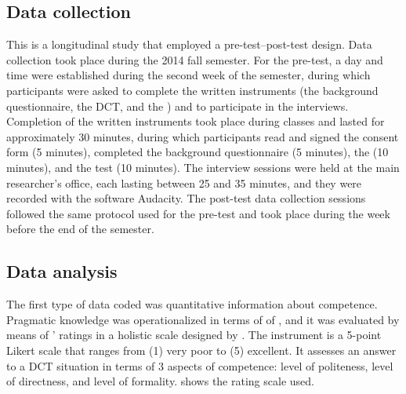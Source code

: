 \documentclass[output=paper]{langsci/langscibook}
\begin{document}
\subsection{Data collection}

This is a longitudinal study that employed a pre-test–post-test design. Data collection took place during the 2014 fall semester. For the pre-test, a day and time were established during the second week of the semester, during which participants were asked to complete the written instruments (the background questionnaire, the DCT, and the ) and to participate in the interviews. Completion of the written instruments took place during   classes and lasted for approximately 30 minutes, during which participants read and signed the consent form (5 minutes), completed the background questionnaire (5 minutes), the  (10 minutes), and the  test (10 minutes). The interview sessions were held at the main researcher’s office, each lasting between 25 and 35 minutes, and they were recorded with the software Audacity. The post-test data collection sessions followed the same protocol used for the pre-test and took place during the week before the end of the semester.


\subsection{Data analysis}

The first type of data coded was quantitative information about  competence. Pragmatic knowledge was operationalized in terms of  of , and it was evaluated by means of ’ ratings in a holistic  scale designed by \citet{Taguchi2011}. The instrument is a 5-point Likert scale that ranges from (1) very poor to (5) excellent. It assesses an answer to a DCT situation in terms of 3 aspects of  competence: level of politeness, level of directness, and level of formality.  shows the rating scale used.
\end{document}
